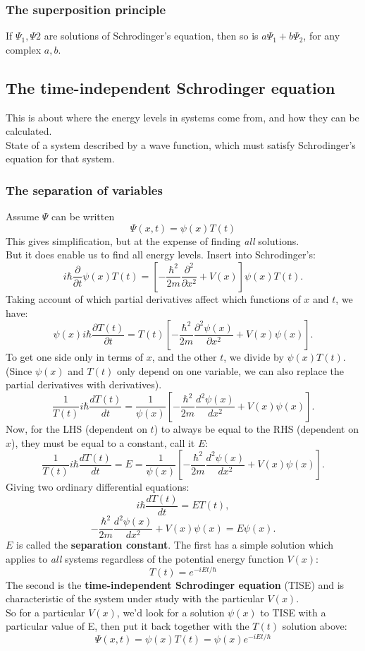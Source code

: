 \documentclass{article}
\begin{document}
\subsubsection{The superposition principle}
If $\Psi_1, \Psi2$ are solutions of Schrodinger's equation, then so is $a\Psi_1 + b\Psi_2$, for any complex $a,b$.

\subsection{The time-independent Schrodinger equation}
This is about where the energy levels in systems come from, and how they can be calculated.\\
State of a system described by a wave function, which must satisfy Schrodinger's equation for that system.\\

\subsubsection{The separation of variables}
Assume $\Psi$ can be written
$$ \Psi(x,t) = \psi(x)T(t) $$
This gives simplification, but at the expense of finding \emph{all} solutions.\\
But it does enable us to find all energy levels.
Insert into Schrodinger's:
$$ i \hbar \frac{\partial}{\partial t}\psi(x)T(t) = \left[ -\frac{\hbar^2}{2m} \frac{\partial^2}{\partial x^2} + V(x)\right] \psi(x)T(t). $$
Taking account of which partial derivatives affect which functions of $x$ and $t$, we have:
$$ \psi(x)i\hbar \frac{\partial T(t)}{\partial t} = T(t)\left[ -\frac{\hbar^2}{2m} \frac{\partial^2\psi(x)}{\partial x^2} + V(x)\psi(x)\right]. $$
To get one side only in terms of $x$, and the other $t$, we divide by $\psi(x)T(t)$.\\
(Since $\psi(x)$ and $T(t)$ only depend on one variable, we can also replace the partial derivatives with derivatives).
$$ \frac{1}{T(t)} i\hbar \frac{d T(t)}{dt} = \frac{1}{\psi(x)}\left[ - \frac{\hbar^2}{2m} \frac{d^2 \psi(x)}{dx^2} + V(x)\psi(x)\right]. $$
Now, for the LHS (dependent on $t$) to always be equal to the RHS (dependent on $x$), they must be equal to a constant, call it $E$:
$$ \frac{1}{T(t)} i\hbar \frac{d T(t)}{dt} = E = \frac{1}{\psi(x)}\left[ - \frac{\hbar^2}{2m} \frac{d^2 \psi(x)}{dx^2} + V(x)\psi(x)\right]. $$
Giving two ordinary differential equations:
$$ i \hbar \frac{dT(t)}{dt} = ET(t), $$
$$ - \frac{\hbar^2}{2m} \frac{d^2\psi(x)}{dx^2} + V(x)\psi(x) = E\psi(x). $$
$E$ is called the \textbf{separation constant}.
The first has a simple solution which applies to \emph{all} systems regardless of the potential energy function $V(x)$:
$$ T(t) = e^{-iEt/\hbar} $$
The second is the \textbf{time-independent Schrodinger equation} (TISE) and is characteristic of the system under study with the particular $V(x)$.\\
So for a particular $V(x)$, we'd look for a solution $\psi(x)$ to TISE with a particular value of E, then put it back together with the $T(t)$ solution above:
$$ \Psi(x,t) = \psi(x)T(t) = \psi(x)e^{-iEt/\hbar} $$
\end{document}
